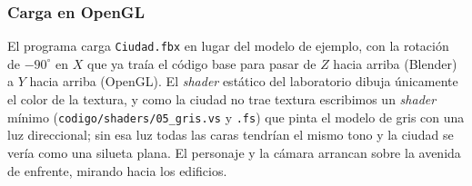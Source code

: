 \subsubsection{Carga en OpenGL}
El programa carga \texttt{Ciudad.fbx} en lugar del modelo de ejemplo, con la rotación de $-90^\circ$ en $X$ que ya traía el código base para pasar de $Z$ hacia arriba (Blender) a $Y$ hacia arriba (OpenGL). El \textit{shader} estático del laboratorio dibuja únicamente el color de la textura, y como la ciudad no trae textura escribimos un \textit{shader} mínimo (\texttt{codigo/shaders/05\_gris.vs} y \texttt{.fs}) que pinta el modelo de gris con una luz direccional; sin esa luz todas las caras tendrían el mismo tono y la ciudad se vería como una silueta plana. El personaje y la cámara arrancan sobre la avenida de enfrente, mirando hacia los edificios.